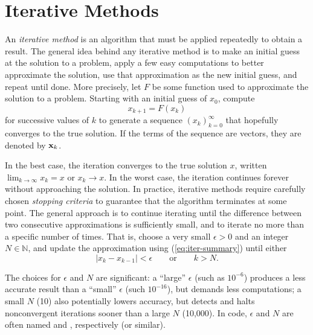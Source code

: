 \label{lab:NewtonsMethod}

\section*{Iterative Methods} %

An \emph{iterative method} is an algorithm that must be applied repeatedly to obtain a result.
The general idea behind any iterative method is to make an initial guess at the solution to a problem, apply a few easy computations to better approximate the solution, use that approximation as the new initial guess, and repeat until done.
More precisely, let $F$ be some function used to approximate the solution to a problem.
Starting with an initial guess of $x_0$, compute
\begin{equation}x_{k+1} = F(x_k)\label{eq:iter-summary}\end{equation}
for successive values of $k$ to generate a sequence $(x_k)_{k=0}^\infty$ that hopefully converges to the true solution.
If the terms of the sequence are vectors, they are denoted by $\mathbf{x}_k$.

In the best case, the iteration converges to the true solution $x$, written $\lim_{k\rightarrow\infty} x_k = x$ or $x_k\rightarrow x$.
In the worst case, the iteration continues forever without approaching the solution.
In practice, iterative methods require carefully chosen \emph{stopping criteria} to guarantee that the algorithm terminates at some point.
The general approach is to continue iterating until the difference between two consecutive approximations is sufficiently small, and to iterate no more than a specific number of times.
That is, choose a very small $\epsilon > 0$ and an integer $N\in\mathbb{N}$, and update the approximation using (\ref{eq:iter-summary}) until either
\begin{equation} %
|x_k - x_{k-1}| < \epsilon
\qquad \text{or} \qquad
k > N.
\end{equation}

The choices for $\epsilon$ and $N$ are significant: a ``large'' $\epsilon$ (such as $10^{-6}$) produces a less accurate result than a ``small'' $\epsilon$ (such $10^{-16}$), but demands less computations; a small $N$ (10) also potentially lowers accuracy, but detects and halts nonconvergent iterations sooner than a large $N$ (10,000).
In code, $\epsilon$ and $N$ are often named  and , respectively (or similar).

